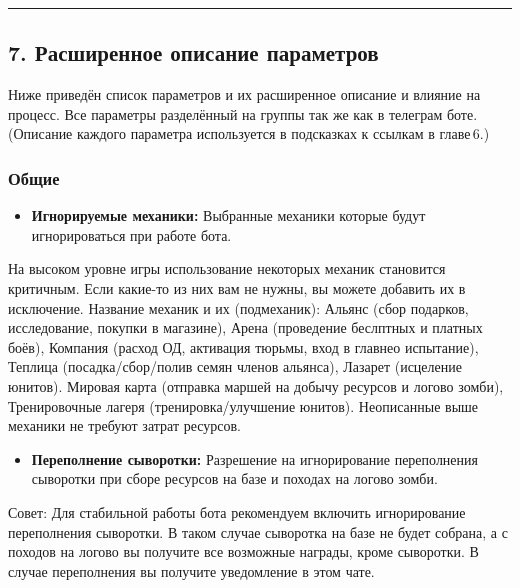 \documentclass[
]{article}
\providecommand{\tightlist}{%
  \setlength{\itemsep}{0pt}\setlength{\parskip}{0pt}}
\begin{document}
\begin{center}\rule{0.5\linewidth}{0.5pt}\end{center}

\subsection{7. Расширенное описание
параметров}\label{ux440ux430ux441ux448ux438ux440ux435ux43dux43dux43eux435-ux43eux43fux438ux441ux430ux43dux438ux435-ux43fux430ux440ux430ux43cux435ux442ux440ux43eux432}

Ниже приведён список параметров и их расширенное описание и влияние на
процесс. Все параметры разделённый на группы так же как в телеграм боте.
(Описание каждого параметра используется в подсказках к ссылкам в
главе\,6.)

\subsubsection{Общие}\label{ux43eux431ux449ux438ux435}

\begin{itemize}
\tightlist
\item
  \textbf{Игнорируемые механики:} Выбранные механики которые будут
  игнорироваться при работе бота.
\end{itemize}

На высоком уровне игры использование некоторых механик становится
критичным. Если какие-то из них вам не нужны, вы можете добавить их в
исключение. Название механик и их (подмеханик): Альянс (сбор подарков,
исследование, покупки в магазине), Арена (проведение беслптных и платных
боёв), Компания (расход ОД, активация тюрьмы, вход в главнео испытание),
Теплица (посадка/сбор/полив семян членов альянса), Лазарет (исцеление
юнитов). Мировая карта (отправка маршей на добычу ресурсов и логово
зомби), Тренировочные лагеря (тренировка/улучшение юнитов). Неописанные
выше механики не требуют затрат ресурсов.

\begin{itemize}
\tightlist
\item
  \textbf{Переполнение сыворотки:} Разрешение на игнорирование
  переполнения сыворотки при сборе ресурсов на базе и походах на логово
  зомби.
\end{itemize}

Совет: Для стабильной работы бота рекомендуем включить игнорирование
переполнения сыворотки. В таком случае сыворотка на базе не будет
собрана, а с походов на логово вы получите все возможные награды, кроме
сыворотки. В случае переполнения вы получите уведомление в этом чате.
\end{document}
